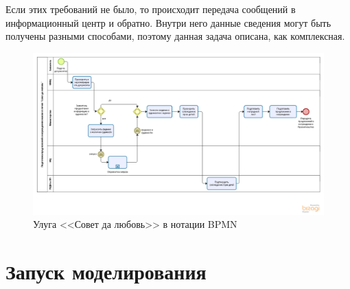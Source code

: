 Если этих требований не было, то происходит передача сообщений
в информационный центр и обратно. Внутри него данные сведения
могут быть получены разными способами, поэтому данная задача
описана, как комплексная.

\begin{figure}
    \centering
    \includegraphics[width=\textwidth]{figures/model-description}
    \caption{Улуга <<Совет да любовь>> в нотации BPMN}
    \label{description}
\end{figure}

\clearpage
\section{Запуск моделирования}


